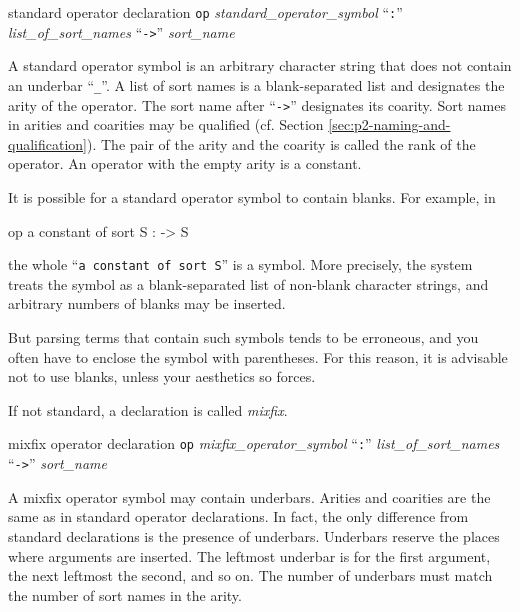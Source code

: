 \documentclass[a4paper]{memoir}
\begin{document}
\begin{bsyntax} standard operator declaration  \Hline
{}
\texttt{op} \textit{standard\_operator\_symbol} ``\texttt{:}'' \textit{list\_of\_sort\_names} ``\texttt{->}'' \textit{sort\_name}
\end{bsyntax}

A standard operator symbol is an arbitrary character string that
does not contain an underbar ``\verb|_|''. A list of
sort names is a blank-separated list and designates the arity
of the operator. The sort name after ``\verb|->|'' designates its
coarity.
Sort names in arities and coarities may be qualified
(cf. Section \ref{sec:p2-naming-and-qualification}).
The pair of the arity and the coarity is called the rank
of the operator. An operator with the empty arity is a
constant.

\begin{warning}
  It is possible for a standard operator symbol to contain blanks. For
  example, in
  \begin{vvtm}
  \begin{ccode}
    op a constant of sort S : -> S
  \end{ccode}
  \end{vvtm}
  the whole ``\verb|a constant of sort S|'' is a symbol. More precisely,
  the system treats the symbol as a blank-separated list of non-blank
  character strings, and arbitrary numbers of blanks may be inserted.

  But parsing terms that contain such symbols tends to be erroneous, and
  you often have to enclose the symbol with parentheses. For this reason,
  it is advisable not to use blanks, unless your aesthetics so forces.
\end{warning}

If not standard, a declaration is called {\em mixfix}.

\begin{bsyntax} mixfix operator declaration \Hline
{}
\texttt{op} \textit{mixfix\_operator\_symbol} ``\texttt{:}'' \textit{list\_of\_sort\_names} ``\texttt{->}'' \textit{sort\_name}
\end{bsyntax}

A mixfix operator symbol may contain underbars. Arities and coarities
are the same as in standard operator declarations. In fact,
the only difference from standard declarations is the presence of
underbars. Underbars reserve the places where arguments are inserted.
The leftmost underbar is for the first argument, the next leftmost the
second, and so on. The number of underbars must match the number
of sort names in the arity.
\end{document}
